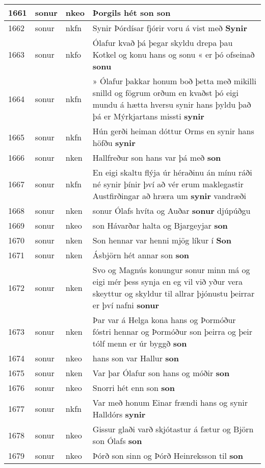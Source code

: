 \documentclass{article}
\begin{document}
\begin{longtable}{p{1cm}|p{1cm}|p{1cm}|p{13cm}}
\hline
1661&sonur&nkeo&Þorgils hét son \textbf{son} \\
\hline
1662&sonur&nkfn&Synir Þórdísar fjórir voru á vist með \textbf{Synir} \\
\hline
1663&sonur&nkfo&Ólafur kvað þá þegar skyldu drepa þau Kotkel og konu hans og sonu « er þó ofseinað \textbf{sonu} \\
\hline
1664&sonur&nkfn&» Ólafur þakkar honum boð þetta með mikilli snilld og fögrum orðum en kvaðst þó eigi mundu á hætta hversu synir hans þyldu það þá er Mýrkjartans missti \textbf{synir} \\
\hline
1665&sonur&nkfn&Hún gerði heiman dóttur Orms en synir hans höfðu \textbf{synir} \\
\hline
1666&sonur&nken&Hallfreður son hans var þá með \textbf{son} \\
\hline
1667&sonur&nkfn&En eigi skaltu flýja úr héraðinu án mínu ráði né synir þínir því að vér erum maklegastir Austfirðingar að hræra um \textbf{synir} vandræði\\
\hline
1668&sonur&nken&sonur Ólafs hvíta og Auðar \textbf{sonur} djúpúðgu\\
\hline
1669&sonur&nkeo&son Hávarðar halta og Bjargeyjar \textbf{son} \\
\hline
1670&sonur&nken&Son hennar var henni mjög líkur í \textbf{Son} \\
\hline
1671&sonur&nken&Ásbjörn hét annar son \textbf{son} \\
\hline
1672&sonur&nken&Svo og Magnús konungur sonur minn má og eigi mér þess synja en eg vil við yður vera skeyttur og skyldur til allrar þjónustu þeirrar er því nafni \textbf{sonur} \\
\hline
1673&sonur&nken&Þar var á Helga kona hans og Þormóður fóstri hennar og Þormóður son þeirra og þeir tólf menn er úr byggð \textbf{son} \\
\hline
1674&sonur&nkeo&hans son var Hallur \textbf{son} \\
\hline
1675&sonur&nken&Var þar Ólafur son hans og móðir \textbf{son} \\
\hline
1676&sonur&nkeo&Snorri hét enn son \textbf{son} \\
\hline
1677&sonur&nkfn&Var með honum Einar frændi hans og synir Halldórs \textbf{synir} \\
\hline
1678&sonur&nkeo&Gissur glaði varð skjótastur á fætur og Björn son Ólafs \textbf{son} \\
\hline
1679&sonur&nkeo&Þórð son sinn og Þórð Heinreksson til \textbf{son} \\
\hline

\end{longtable}
\end{document}
